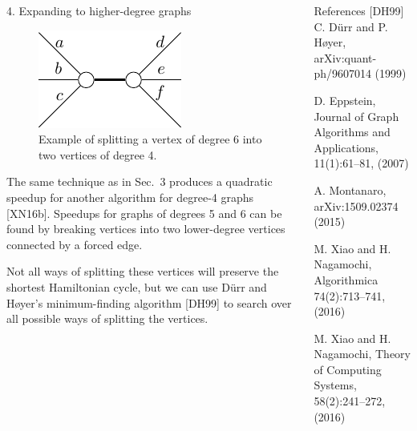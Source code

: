 \documentclass[]{templates/poster}
\begin{document}
\begin{frame}{}
\begin{columns}[t]
\begin{column}{0.422\linewidth}
  \begin{block}{\Large 4. Expanding to higher-degree graphs}
  \begin{figure}
  \includegraphics[width=\linewidth]{deg5}
  \caption{Example of splitting a vertex of degree 6 into two vertices of degree 4.}
  \end{figure}

  The same technique as in Sec.\ 3 produces a quadratic speedup for another algorithm for degree-4 graphs [XN16b]. Speedups for graphs of degrees 5 and 6 can be found by breaking vertices into two lower-degree vertices connected by a forced edge.
  
  Not all ways of splitting these vertices will preserve the shortest Hamiltonian cycle, but we can use D\"urr and H\o yer's minimum-finding algorithm [DH99] to search over all possible ways of splitting the vertices.
  \end{block}
  \end{column}

  \begin{column}{0.422\linewidth}
  \begin{block}{\Large References}
  [DH99] C. D\"urr and P. H\o yer, arXiv:quant-ph/9607014 (1999)

  \noindent[Epp07] D. Eppstein, Journal of Graph Algorithms and Applications, 11(1):61--81, (2007)

  \noindent[Mon15] A. Montanaro, arXiv:1509.02374 (2015)

  \noindent[XN16a] M. Xiao and H. Nagamochi, Algorithmica 74(2):713--741, (2016)

  \noindent[XN16b] M. Xiao and H. Nagamochi, Theory of Computing Systems, 58(2):241--272, (2016)
  \end{block}
  \end{column}
\end{columns}

\end{frame}

\end{document}
